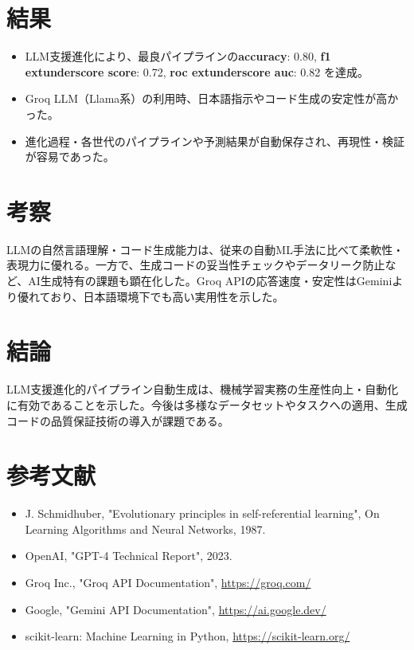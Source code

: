 \documentclass[a4paper,12pt]{article}
\begin{document}
\section{結果}
\begin{itemize}
  \item LLM支援進化により、最良パイプラインの\textbf{accuracy}: 0.80, \textbf{f1	extunderscore score}: 0.72, \textbf{roc	extunderscore auc}: 0.82 を達成。
  \item Groq LLM（Llama系）の利用時、日本語指示やコード生成の安定性が高かった。
  \item 進化過程・各世代のパイプラインや予測結果が自動保存され、再現性・検証が容易であった。
\end{itemize}

\section{考察}
LLMの自然言語理解・コード生成能力は、従来の自動ML手法に比べて柔軟性・表現力に優れる。一方で、生成コードの妥当性チェックやデータリーク防止など、AI生成特有の課題も顕在化した。Groq APIの応答速度・安定性はGeminiより優れており、日本語環境下でも高い実用性を示した。

\section{結論}
LLM支援進化的パイプライン自動生成は、機械学習実務の生産性向上・自動化に有効であることを示した。今後は多様なデータセットやタスクへの適用、生成コードの品質保証技術の導入が課題である。

\section*{参考文献}
\begin{itemize}
  \item J. Schmidhuber, "Evolutionary principles in self-referential learning", On Learning Algorithms and Neural Networks, 1987.
  \item OpenAI, "GPT-4 Technical Report", 2023.
  \item Groq Inc., "Groq API Documentation", \url{https://groq.com/}
  \item Google, "Gemini API Documentation", \url{https://ai.google.dev/}
  \item scikit-learn: Machine Learning in Python, \url{https://scikit-learn.org/}
\end{itemize}
\end{document}
